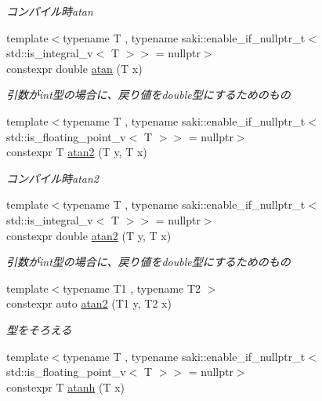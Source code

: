 \begin{DoxyCompactItemize}
\begin{DoxyCompactList}\small\item\em コンパイル時atan \end{DoxyCompactList}\item 
{\footnotesize template$<$typename T , typename saki\+::enable\+\_\+if\+\_\+nullptr\+\_\+t$<$ std\+::is\+\_\+integral\+\_\+v$<$ T $>$$>$  = nullptr$>$ }\\constexpr double \mbox{\hyperlink{namespacesaki_acd8a08085fc9210a4e8d61f6c04febe2}{atan}} (T x)
\begin{DoxyCompactList}\small\item\em 引数がint型の場合に、戻り値をdouble型にするためのもの \end{DoxyCompactList}\item 
{\footnotesize template$<$typename T , typename saki\+::enable\+\_\+if\+\_\+nullptr\+\_\+t$<$ std\+::is\+\_\+floating\+\_\+point\+\_\+v$<$ T $>$$>$  = nullptr$>$ }\\constexpr T \mbox{\hyperlink{namespacesaki_ac528a4ab6013623bfe6257229e302015}{atan2}} (T y, T x)
\begin{DoxyCompactList}\small\item\em コンパイル時atan2 \end{DoxyCompactList}\item 
{\footnotesize template$<$typename T , typename saki\+::enable\+\_\+if\+\_\+nullptr\+\_\+t$<$ std\+::is\+\_\+integral\+\_\+v$<$ T $>$$>$  = nullptr$>$ }\\constexpr double \mbox{\hyperlink{namespacesaki_a1f8c6dc6223b790f6d227c8d22cf8b86}{atan2}} (T y, T x)
\begin{DoxyCompactList}\small\item\em 引数がint型の場合に、戻り値をdouble型にするためのもの \end{DoxyCompactList}\item 
{\footnotesize template$<$typename T1 , typename T2 $>$ }\\constexpr auto \mbox{\hyperlink{namespacesaki_a5c656a9f2a0c0cfe522fb95ac37128cc}{atan2}} (T1 y, T2 x)
\begin{DoxyCompactList}\small\item\em 型をそろえる \end{DoxyCompactList}\item 
{\footnotesize template$<$typename T , typename saki\+::enable\+\_\+if\+\_\+nullptr\+\_\+t$<$ std\+::is\+\_\+floating\+\_\+point\+\_\+v$<$ T $>$$>$  = nullptr$>$ }\\constexpr T \mbox{\hyperlink{namespacesaki_adbfceeab527c51676d00fae31e077dcf}{atanh}} (T x)

\end{DoxyCompactItemize}
